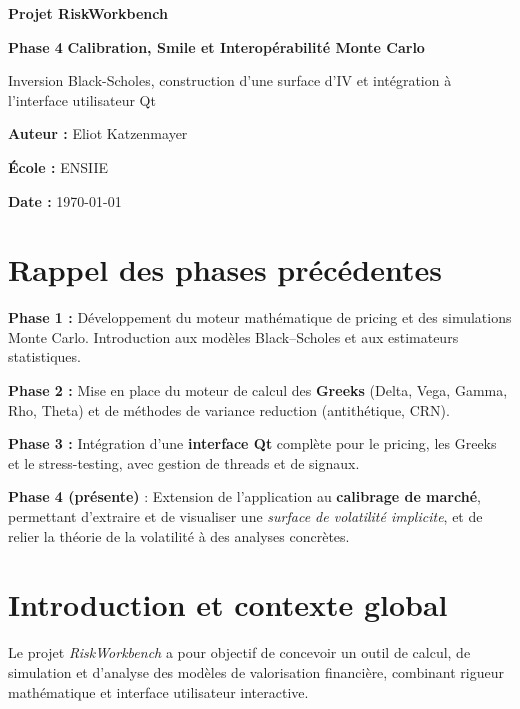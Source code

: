 \documentclass[11pt,a4paper]{article}
\begin{document}
\begin{titlepage}
  \centering
  {\Large \textbf{Projet RiskWorkbench}}\par\vspace{0.5cm}
  {\huge \textbf{Phase 4} \vspace{0.5cm} \textbf{Calibration, Smile et Interopérabilité Monte Carlo}}\par
  \vspace{0.8cm}
  {\large Inversion Black-Scholes, construction d'une surface d'IV et intégration à l'interface utilisateur Qt}\par
  \vfill
  \textbf{Auteur :} Eliot Katzenmayer \par
  \textbf{École :} ENSIIE \par
  \textbf{Date :} \today
  \vfill
\end{titlepage}

\tableofcontents
\clearpage


\section*{Rappel des phases précédentes}

\begin{tcolorbox}[colback=blue!5!white,colframe=blue!50!black,title={Résumé des phases 1 à 3}]
\textbf{Phase 1 :} Développement du moteur mathématique de pricing et des simulations Monte Carlo.  
Introduction aux modèles Black--Scholes et aux estimateurs statistiques.  

\textbf{Phase 2 :} Mise en place du moteur de calcul des \textbf{Greeks} (Delta, Vega, Gamma, Rho, Theta) et de méthodes de variance reduction (antithétique, CRN).  

\textbf{Phase 3 :} Intégration d’une \textbf{interface Qt} complète pour le pricing, les Greeks et le stress-testing, avec gestion de threads et de signaux.  

\textbf{Phase 4 (présente)} : Extension de l’application au \textbf{calibrage de marché}, permettant d’extraire et de visualiser une \emph{surface de volatilité implicite}, et de relier la théorie de la volatilité à des analyses concrètes.
\end{tcolorbox}

\clearpage

\section{Introduction et contexte global}
Le projet \textit{RiskWorkbench} a pour objectif de concevoir un outil de calcul, de simulation et d’analyse des modèles de valorisation financière, combinant rigueur mathématique et interface utilisateur interactive.  
\end{document}
